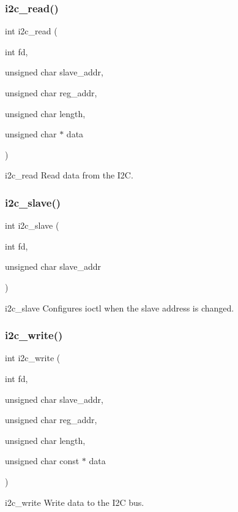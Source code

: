 \subsubsection{i2c\+\_\+read()}
{\footnotesize\ttfamily int i2c\+\_\+read (\begin{DoxyParamCaption}\item[{int}]{fd,  }\item[{unsigned char}]{slave\+\_\+addr,  }\item[{unsigned char}]{reg\+\_\+addr,  }\item[{unsigned char}]{length,  }\item[{unsigned char $\ast$}]{data }\end{DoxyParamCaption})}

i2c\+\_\+read Read data from the I2C. \mbox{\label{i2c_8h_a1e3e7559d73b070ef09dbfe365c032f7}} 
\subsubsection{i2c\+\_\+slave()}
{\footnotesize\ttfamily int i2c\+\_\+slave (\begin{DoxyParamCaption}\item[{int}]{fd,  }\item[{unsigned char}]{slave\+\_\+addr }\end{DoxyParamCaption})}

i2c\+\_\+slave Configures \textquotesingle{}ioctl\textquotesingle{} when the slave address is changed. \mbox{\label{i2c_8h_acd741d59fd77f48f150cb53d70a520d9}} 
\subsubsection{i2c\+\_\+write()}
{\footnotesize\ttfamily int i2c\+\_\+write (\begin{DoxyParamCaption}\item[{int}]{fd,  }\item[{unsigned char}]{slave\+\_\+addr,  }\item[{unsigned char}]{reg\+\_\+addr,  }\item[{unsigned char}]{length,  }\item[{unsigned char const $\ast$}]{data }\end{DoxyParamCaption})}

i2c\+\_\+write Write data to the I2C bus. 